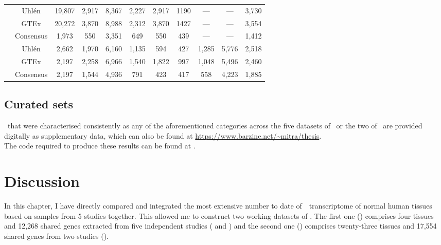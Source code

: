 \begin{landscape}
\begin{table}[]
\begin{tabular}{@{}ccccccccccc@{}}
& Uhlén & 19,807 & 2,917 & 8,367 & 2,227 &
2,917  & 1190  & --- & --- & 3,730  \\
& GTEx & 20,272 & 3,870 & 8,988  & 2,312 &
3,870  & 1427  & --- & --- & 3,554  \\
\cmidrule(l){2-11}
& Consensus & 1,973 & 550 & 3,351 & 649 &
550  & 439 & --- & --- & 1,412  \\
\midrule
\multirow{3}{*}{\rotatebox[origin=c]{90}{\parbox[c]{1.7cm}{\centering Common\\ 23
tissues\\ Working datasets}}} & Uhlén & 2,662  & 1,970  &
6,160 & 1,135 & 594  & 427 & 1,285 &
5,776 & 2,518 \\
& GTEx & 2,197 & 2,258 & 6,966  & 1,540 &
1,822  & 997 & 1,048 & 5,496  & 2,460 \\
\cmidrule(l){2-11}
& Consensus & 2,197 & 1,544 & 4,936 & 791 &
423 & 417 & 558 & 4,223 & 1,885 \\
\bottomrule
\end{tabular}
\end{table}
\end{landscape}
\pagestyle{scrheadings}


\subsection{Curated sets}\label{subsec:Trans_curatedSets}
\Pcgs\ that were characterised consistently
as any of the aforementioned categories across the five datasets of \setOne\
or the two of \setTwo\
are provided digitally as supplementary data,
which can also be found at \url{https://www.barzine.net/~mitra/thesis}.
\\The code required to produce these results can be found at \github.


\section{Discussion}\label{sec:Trans_discussion}

In this chapter,
I have directly compared and integrated
the most extensive number to date of~\Rnaseq\ transcriptome
of normal human tissues based on samples from 5 studies together.
This allowed me to construct two working datasets of \pcgs.
The first one (\setOne) comprises four tissues
and 12,268 shared genes
extracted from five independent studies
(\cite{Krupp2012,VTpaper,Uhlen2015,GTExTranscript} and \ibm)
and the second one (\setTwo) comprises twenty-three tissues
and 17,554 shared genes
from two studies (\cite{Uhlen2015,GTExTranscript}).

